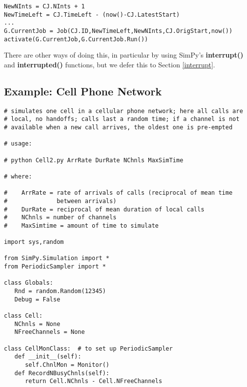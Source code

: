 \documentclass[11pt]{article}
\begin{document}
\begin{Verbatim}[fontsize=\relsize{-2}]
NewNInts = CJ.NInts + 1
NewTimeLeft = CJ.TimeLeft - (now()-CJ.LatestStart)
...
G.CurrentJob = Job(CJ.ID,NewTimeLeft,NewNInts,CJ.OrigStart,now())
activate(G.CurrentJob,G.CurrentJob.Run())
\end{Verbatim}

There are other ways of doing this, in particular by using SimPy's {\bf
interrupt()} and {\bf interrupted()} functions, but we defer this to
Section \ref{interrupt}.

\subsection{Example: Cell Phone Network}

\begin{Verbatim}[fontsize=\relsize{-2}]
# simulates one cell in a cellular phone network; here all calls are
# local, no handoffs; calls last a random time; if a channel is not
# available when a new call arrives, the oldest one is pre-empted

# usage:  

# python Cell2.py ArrRate DurRate NChnls MaxSimTime

# where:

#    ArrRate = rate of arrivals of calls (reciprocal of mean time
#              between arrivals)
#    DurRate = reciprocal of mean duration of local calls
#    NChnls = number of channels
#    MaxSimtime = amount of time to simulate

import sys,random

from SimPy.Simulation import *
from PeriodicSampler import *

class Globals:
   Rnd = random.Random(12345)
   Debug = False

class Cell:  
   NChnls = None  
   NFreeChannels = None  

class CellMonClass:  # to set up PeriodicSampler
   def __init__(self):
      self.ChnlMon = Monitor()
   def RecordNBusyChnls(self):
      return Cell.NChnls - Cell.NFreeChannels


\end{Verbatim}
\end{document}
